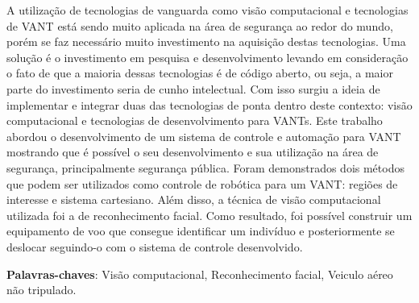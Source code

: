 
\setlength{\absparsep}{18pt} %
\begin{resumo}
A utilização de tecnologias de vanguarda como visão computacional e tecnologias de VANT está sendo muito aplicada na área de segurança ao redor do mundo, porém se faz necessário muito investimento na aquisição destas tecnologias. Uma solução é o investimento em pesquisa e desenvolvimento levando em consideração o fato de que a maioria dessas tecnologias é de código aberto, ou seja, a maior parte do investimento seria de cunho intelectual. Com isso surgiu a ideia de implementar e integrar duas das tecnologias de ponta dentro deste contexto: visão computacional e tecnologias de desenvolvimento para VANTs. Este trabalho abordou o desenvolvimento de um sistema de controle e automação para VANT mostrando que é possível o seu desenvolvimento e sua utilização na área de segurança, principalmente segurança pública. Foram demonstrados dois métodos que podem ser utilizados como controle de robótica para um VANT: regiões de interesse e sistema cartesiano. Além disso, a técnica de visão computacional utilizada foi a de reconhecimento facial. Como resultado, foi possível construir um equipamento de voo que consegue identificar um indivíduo e posteriormente se deslocar seguindo-o com o sistema de controle desenvolvido.

 \textbf{Palavras-chaves}: Visão computacional, Reconhecimento facial, Veiculo aéreo não tripulado.
\end{resumo}

